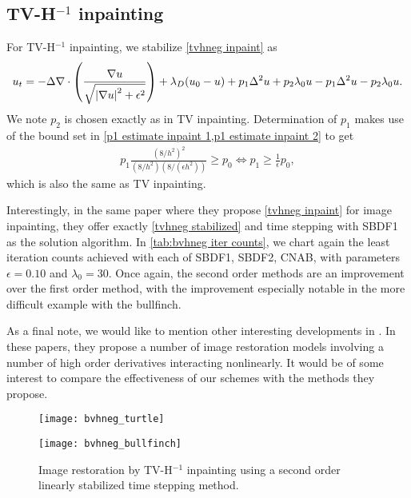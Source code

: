 \subsection{TV-H\texorpdfstring{$^{-1}$}{-1} inpainting}
For TV-H$^{-1}$ inpainting, we stabilize \cref{tvhneg inpaint} as 
\begin{align}
        u_t = -\Delta \nabla \cdot \left(\frac{\nabla u}{\sqrt{\left|\nabla u\right|^2 + \epsilon^2}} \right) + \lambda_D(u_0 - u)  + p_1\Delta^2 u + p_2\lambda_0 u - p_1\Delta^2 u - p_2\lambda_0 u.
\label{tvhneg stabilized}
\end{align}
We note $p_2$ is chosen exactly as in TV inpainting. Determination of $p_1$ makes use of the bound set in \cref{p1 estimate inpaint 1,p1 estimate inpaint 2} to get 
\begin{align}
        p_1\frac{(8/h^2)^2}{(8/h^2)(8/(\epsilon h^2))} \geq p_0 
\iff p_1 \geq \frac{1}{\epsilon}p_0,
\end{align}
which is also the same as TV inpainting.

Interestingly, in the same paper where they propose \cref{tvhneg inpaint} for image inpainting, they offer exactly \cref{tvhneg stabilized} and time stepping with SBDF1 as the solution algorithm. In \cref{tab:bvhneg iter counts}, we chart again the least iteration counts achieved with each of SBDF1, SBDF2, CNAB, with parameters $\epsilon=0.10$ and $\lambda_0=30$. Once again, the second order methods are an improvement over the first order method, with the improvement especially notable in the more difficult example with the bullfinch. 

As a final note, we would like to mention other interesting developments in \cite{bredies2010total,papafitsoros2014combined,papafitsoros2013combined}. In these papers, they propose a number of image restoration models involving a number of high order derivatives interacting nonlinearly. It would be of some interest to compare the effectiveness of our schemes with the methods they propose.

\begin{figure}[htb!]
	\centering
\begin{minipage}{0.65\textwidth}
	\texttt{[image: bvhneg\_turtle]}
\end{minipage}
\begin{minipage}{0.65\textwidth}
	\texttt{[image: bvhneg\_bullfinch]}
\end{minipage}
\caption[Image restoration by TV-H$^{-1}$ inpainting.]{Image restoration by TV-H$^{-1}$ inpainting using a second order linearly stabilized time stepping method.}
\label{fig:bvhneg inpainting}
\end{figure}

